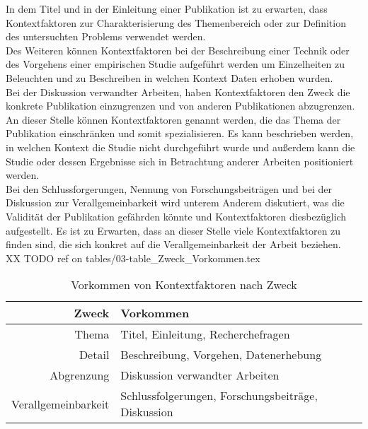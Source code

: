 In dem Titel und in der Einleitung einer Publikation ist zu erwarten, dass Kontextfaktoren zur Charakterisierung des Themenbereich oder zur Definition des untersuchten Problems verwendet werden. \\
Des Weiteren können Kontextfaktoren bei der Beschreibung einer Technik oder des Vorgehens einer empirischen Studie aufgeführt werden um Einzelheiten zu Beleuchten und zu Beschreiben in welchen Kontext Daten erhoben wurden. \\
Bei der Diskussion verwandter Arbeiten, haben Kontextfaktoren den Zweck die konkrete Publikation einzugrenzen und von anderen Publikationen abzugrenzen. An dieser Stelle können Kontextfaktoren genannt werden, die das Thema der Publikation einschränken und somit spezialisieren. Es kann beschrieben werden, in welchen Kontext die Studie nicht durchgeführt wurde und außerdem kann die Studie oder dessen Ergebnisse sich in Betrachtung anderer Arbeiten positioniert werden. \\
Bei den Schlussforgerungen, Nennung von Forschungsbeiträgen und bei der Diskussion zur Verallgemeinbarkeit wird unterem Anderem diskutiert, was die Validität der Publikation gefährden könnte und Kontextfaktoren diesbezüglich aufgestellt. Es ist zu Erwarten, dass an dieser Stelle viele Kontextfaktoren zu finden sind, die sich konkret auf die Verallgemeinbarkeit der Arbeit beziehen. \\

XX TODO ref on tables/03-table_Zweck_Vorkommen.tex  \\
\begin{table}[h!]
\begin{tabular}{ r | l }
 Zweck & Vorkommen \\ 
  \hline
  Thema & Titel, Einleitung, Recherchefragen \\  
  Detail & Beschreibung, Vorgehen, Datenerhebung \\
  Abgrenzung & Diskussion verwandter Arbeiten \\
  Verallgemeinbarkeit & Schlussfolgerungen, Forschungsbeiträge, Diskussion\\
\end{tabular}
\caption{Vorkommen von Kontextfaktoren nach Zweck}
\label{table:vorkommen}
\end{table}

